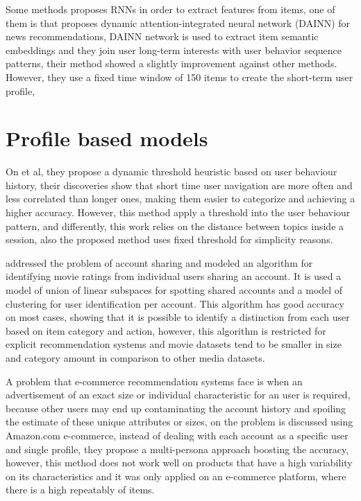 \documentclass[ecp,tc,english]{iiufrgs}
\begin{document}
Some methods proposes RNNs in order to extract features from  items, one of them is \cite{zhang2019} that proposes dynamic attention-integrated neural network (DAINN) for news recommendations, DAINN network is used to extract item semantic embeddings and they join user long-term interests with user behavior sequence patterns, their method showed a slightly improvement against other methods. However, they use a fixed time window of 150 items to create the short-term user profile,

\section{Profile based models}

On \cite{jindal2020} et al, they propose a dynamic threshold heuristic based on user behaviour history, their discoveries show that short time user navigation are more often and less correlated than longer ones, making them easier to categorize and achieving a higher accuracy. However, this method apply a threshold into the user behaviour pattern, and differently, this work relies on the distance between topics inside a session, also the proposed method uses fixed threshold for simplicity reasons.

\cite{zhang2012} addressed the problem of account sharing and modeled an algorithm for identifying movie ratings from individual users sharing an account. It is used a model of union of linear subspaces for spotting shared accounts and a model of clustering for user identification per account. This algorithm has good accuracy on most cases, showing that it is possible to identify a distinction from each user based on item category and action, however, this algorithm is restricted for explicit recommendation systems and movie datasets tend to be smaller in size and category amount in comparison to other media datasets.

A problem that e-commerce recommendation systems face is when an advertisement of an exact size or individual characteristic for an user is required, because other users may end up contaminating the account history and spoiling the estimate of these unique attributes or sizes, on \cite{sembium2018} the problem is discussed using Amazon.com e-commerce, instead of dealing with each account as a specific user and single profile, they propose a multi-persona approach boosting the accuracy, however, this method does not work well on products that have a high variability on its characteristics and it was only applied on an e-commerce platform, where there is a high repeatably of items.
\end{document}
